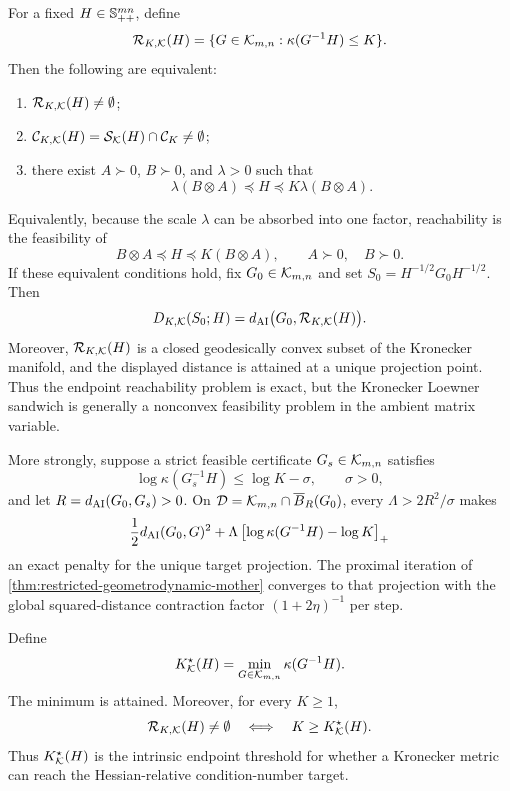 \begin{theorem}
\label{thm:kron-relative-reachability}
For a fixed \(H\in\mathbb S_{++}^{mn}\), define
\[
  \mathcal R_{K,\mathcal K}(H)
  =
  \{G\in\mathcal K_{m,n}:\kappa(G^{-1}H)\le K\}.
\]
Then the following are equivalent:
\begin{enumerate}[leftmargin=*,itemsep=0.2em]
  \item \(\mathcal R_{K,\mathcal K}(H)\ne\emptyset\);
  \item \(\mathcal C_{K,\mathcal K}(H)=\mathcal S_{\mathcal K}(H)\cap\mathcal C_K\ne\emptyset\);
  \item there exist \(A\succ0\), \(B\succ0\), and \(\lambda>0\) such that
  \[
    \lambda(B\otimes A)\preceq H\preceq K\lambda(B\otimes A).
  \]
\end{enumerate}
Equivalently, because the scale \(\lambda\) can be absorbed into one factor,
reachability is the feasibility of
\[
  B\otimes A\preceq H\preceq K(B\otimes A),
  \qquad A\succ0,\quad B\succ0.
\]
If these equivalent conditions hold, fix \(G_0\in\mathcal K_{m,n}\) and set
\(S_0=H^{-1/2}G_0H^{-1/2}\). Then
\[
  D_{K,\mathcal K}(S_0;H)
  =
  d_{\mathrm{AI}}\bigl(G_0,\mathcal R_{K,\mathcal K}(H)\bigr).
\]
Moreover, \(\mathcal R_{K,\mathcal K}(H)\) is a closed geodesically convex subset of
the Kronecker manifold, and the displayed distance is attained at a unique
projection point. Thus the endpoint reachability problem is exact, but the
Kronecker Loewner sandwich is generally a nonconvex feasibility problem in the
ambient matrix variable.

More strongly, suppose a strict feasible certificate \(G_s\in\mathcal K_{m,n}\)
satisfies
\[
  \log\kappa(G_s^{-1}H)\le\log K-\sigma,
  \qquad \sigma>0,
\]
and let \(R=d_{\mathrm{AI}}(G_0,G_s)>0\). On
\(\mathcal D=\mathcal K_{m,n}\cap\overline B_R(G_0)\), every
\(\Lambda>2R^2/\sigma\) makes
\[
  \frac12d_{\mathrm{AI}}(G_0,G)^2
  +\Lambda\left[\log\kappa(G^{-1}H)-\log K\right]_+
\]
an exact penalty for the unique target projection. The proximal iteration of
\cref{thm:restricted-geometrodynamic-mother} converges to that projection with
the global squared-distance contraction factor \((1+2\eta)^{-1}\) per step.
\end{theorem}

\begin{corollary}
\label{cor:kron-kstar}
Define
\[
  K_{\mathcal K}^\star(H)
  =
  \min_{G\in\mathcal K_{m,n}}\kappa(G^{-1}H).
\]
The minimum is attained. Moreover, for every \(K\ge1\),
\[
  \mathcal R_{K,\mathcal K}(H)\ne\emptyset
  \quad\Longleftrightarrow\quad
  K\ge K_{\mathcal K}^\star(H).
\]
Thus \(K_{\mathcal K}^\star(H)\) is the intrinsic endpoint threshold for whether a
Kronecker metric can reach the Hessian-relative condition-number target.
\end{corollary}

